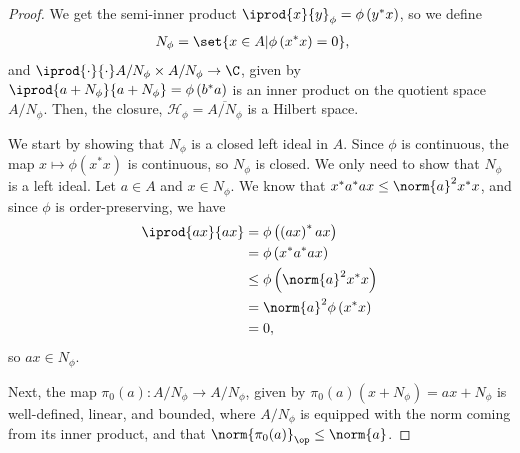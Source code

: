 \documentclass[10pt]{mypackage}
\begin{document}
\begin{proof}
  We get the semi-inner product $ \iprod{x}{y}_{\phi} = \phi\left(y^{\ast}x\right) $, so we define
  \begin{align*}
    N_{\phi} &= \set{x\in A | \phi\left(x^{\ast}x\right)=  0},
  \end{align*}
  and $ \iprod{\cdot}{\cdot}A/N_{\phi}\times A/N_{\phi} \rightarrow \C$, given by $ \iprod{a + N_{\phi}}{a + N_{\phi}} = \phi\left(b^{\ast}a\right) $ is an inner product on the quotient space $A/N_{\phi}$. Then, the closure, $\mathcal{H}_{\phi} = \overline{A/N_{\phi}}$ is a Hilbert space.\newline

  We start by showing that $N_{\phi}$ is a closed left ideal in $A$. Since $\phi$ is continuous, the map $x\mapsto \phi\left(x^{\ast}x\right)$ is continuous, so $N_{\phi}$ is closed. We only need to show that $N_{\phi}$ is a left ideal. Let $a\in A$ and $x\in N_{\phi}$. We know that $x^{\ast}a^{\ast}ax \leq \norm{a}^2x^{\ast}x$, and since $\phi$ is order-preserving, we have
  \begin{align*}
    \iprod{ax}{ax} &= \phi\left(\left(ax\right)^{\ast}ax\right)\\
                   &= \phi\left(x^{\ast}a^{\ast}ax\right)\\
                   &\leq \phi\left(\norm{a}^2x^{\ast}x\right)\\
                   &= \norm{a}^2\phi\left(x^{\ast}x\right)\\
                   &= 0,
  \end{align*}
  so $ax\in N_{\phi}$.\newline

  Next, the map $\pi_0\left(a\right)\colon A/N_{\phi}\rightarrow A/N_{\phi}$, given by $\pi_0(a)\left(x + N_{\phi}\right) = ax + N_{\phi}$ is well-defined, linear, and bounded, where $A/N_{\phi}$ is equipped with the norm coming from its inner product, and that $\norm{\pi_0(a)}_{\op} \leq \norm{a}$.\newline


\end{proof}
\end{document}
